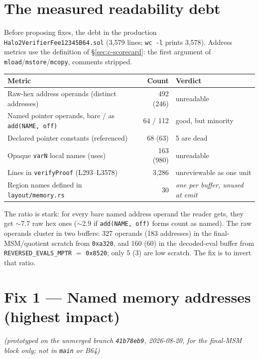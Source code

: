 \section{The measured readability debt}
\label{sec:read-measure}

Before proposing fixes, the debt in the production
\texttt{Halo2VerifierFee12345B64.sol} (3{,}579 lines; \texttt{wc -l} prints
3{,}578). Address metrics use the definition of
\S\ref{sec:c-scorecard}: the first argument of
\texttt{mload}/\texttt{mstore}/\texttt{mcopy}, comments stripped.

\begin{center}
\begin{tabular}{@{}lrl@{}}
\toprule
\textbf{Metric} & \textbf{Count} & \textbf{Verdict} \\
\midrule
Raw-hex address operands (distinct addresses) & 492 (246) & unreadable \\
Named pointer operands, bare / as \texttt{add(NAME, off)} & 64 / 112 & good, but minority \\
Declared pointer constants (referenced) & 68 (63) & 5 are dead \\
Opaque \texttt{varN} local names (uses) & 163 (980) & unreadable \\
Lines in \texttt{verifyProof} (L293--L3578) & 3{,}286 & unreviewable as one unit \\
Region names defined in \texttt{layout/memory.rs} & 30 & \emph{one per buffer, unused at emit} \\
\bottomrule
\end{tabular}
\end{center}

The ratio is stark: for every bare named address operand the reader gets,
they get $\sim$7.7 raw hex ones ($\sim$2.9 if \texttt{add(NAME, off)} forms
count as named). The raw operands cluster in two buffers: 327 operands (183
addresses) in the final-MSM/quotient scratch from \texttt{0xa320}, and 160
(60) in the decoded-eval buffer from \texttt{REVERSED\_\allowbreak{}EVALS\_\allowbreak{}MPTR}
$=$ \texttt{0x8520}; only 5 (3) are low scratch. The fix is to invert that
ratio.

\section{Fix 1 --- Named memory addresses (highest impact)}
\label{sec:read-named-addr}
 \emph{(prototyped on the unmerged branch \texttt{41b78eb9},
2026-08-20, for the final-MSM block only; not in \texttt{main} or B64)}

